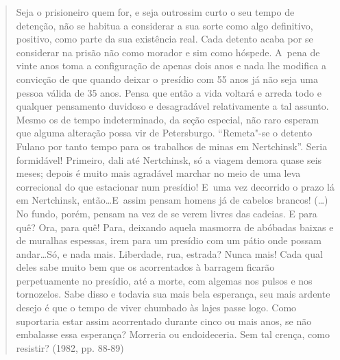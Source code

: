 \begin{quote}
Seja o prisioneiro quem for, e seja outrossim curto o seu tempo de
detenção, não se habitua a considerar a sua sorte como algo definitivo,
positivo, como parte da sua existência real. Cada detento acaba por se
considerar na prisão não como morador e sim como hóspede. A~pena de
vinte anos toma a configuração de apenas dois anos e nada lhe modifica a
convicção de que quando deixar o presídio com 55 anos já não seja uma
pessoa válida de 35 anos. Pensa que então a vida voltará e arreda todo e
qualquer pensamento duvidoso e desagradável relativamente a tal assunto.
Mesmo os de tempo indeterminado, da seção especial, não raro esperam que
alguma alteração possa vir de Petersburgo. ``Remeta"-se o detento Fulano
por tanto tempo para os trabalhos de minas em Nertchinsk''. Seria
formidável! Primeiro, dali até Nertchinsk, só a viagem demora quase seis
meses; depois é muito mais agradável marchar no meio de uma leva
correcional do que estacionar num presídio! E~uma vez decorrido o prazo
lá em Nertchinsk, então\ldots E~assim pensam homens já de cabelos brancos!
(\ldots) No fundo, porém, pensam na vez de se verem livres das cadeias. E
para quê? Ora, para quê! Para, deixando aquela masmorra de abóbadas
baixas e de muralhas espessas, irem para um presídio com um pátio onde
possam andar\ldots Só, e nada mais. Liberdade, rua, estrada? Nunca mais!
Cada qual deles sabe muito bem que os acorrentados à barragem ficarão
perpetuamente no presídio, até a morte, com algemas nos pulsos e nos
tornozelos. Sabe disso e todavia sua mais bela esperança, seu mais
ardente desejo é que o tempo de viver chumbado às lajes passe logo. Como
suportaria estar assim acorrentado durante cinco ou mais anos, se não
embalasse essa esperança? Morreria ou endoideceria. Sem tal crença, como
resistir? (1982, pp. 88-89)
\end{quote}

